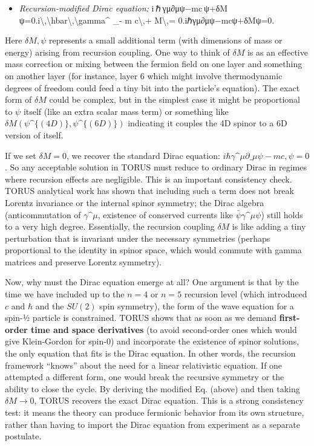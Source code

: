 \documentclass[]{article}
\begin{document}
\begin{itemize}
\item
  \emph{Recursion-modified Dirac equation:}
  i ℏ γμ∂μψ−mc ψ+δM ψ=0.i\textbackslash{},\textbackslash{}hbar\textbackslash{},\textbackslash{}gamma\^{}\mu
  \partial\_\mu \psi - m
  c\textbackslash{},\psi + \delta
  M\textbackslash{},\psi = 0.iℏγμ∂μ​ψ−mcψ+δMψ=0.
\end{itemize}

Here $\delta M,\psi$ represents a small
additional term (with dimensions of mass or energy) arising from
recursion coupling​. One way to think of $\delta M$ is
as an effective mass correction or mixing between the fermion field on
one layer and something on another layer (for instance, layer 6 which
might involve thermodynamic degrees of freedom could feed a tiny bit
into the particle's equation). The exact form of $\delta
M$ could be complex, but in the simplest case it might be proportional
to $\psi$ itself (like an extra scalar mass term) or
something like $\delta
M(\psi\^{}\{(4D)\}, \psi\^{}\{(6D)\})$
indicating it couples the 4D spinor to a 6D version of itself​.

If we set $\delta M = 0$, we recover the standard Dirac
equation: $i\hbar
\gamma\^{}\mu
\partial\_\mu \psi - m
c,\psi = 0$​. So any acceptable solution in TORUS must
reduce to ordinary Dirac in regimes where recursion effects are
negligible. This is an important consistency check. TORUS analytical
work has shown that including such a term does not break Lorentz
invariance or the internal spinor symmetry; the Dirac algebra
(anticommutation of $\gamma\^{}\mu$,
existence of conserved currents like
$\bar\psi
\gamma\^{}\mu \psi$) still
holds to a very high degree​. Essentially, the recursion coupling
$\delta M$ is like adding a tiny perturbation that is
invariant under the necessary symmetries (perhaps proportional to the
identity in spinor space, which would commute with gamma matrices and
preserve Lorentz symmetry).

Now, why must the Dirac equation emerge at all? One argument is that by
the time we have included up to the $n=4$ or $n=5$
recursion level (which introduced $c$ and
$\hbar$ and the $SU(2)$ spin symmetry), the
form of the wave equation for a spin-½ particle is constrained. TORUS
shows that as soon as we demand \textbf{first-order time and space
derivatives} (to avoid second-order ones which would give Klein-Gordon
for spin-0) and incorporate the existence of spinor solutions, the only
equation that fits is the Dirac equation​. In other words, the recursion
framework ``knows'' about the need for a linear relativistic equation.
If one attempted a different form, one would break the recursive
symmetry or the ability to close the cycle. By deriving the modified Eq.
(above) and then taking $\delta M \to 0$, TORUS
recovers the exact Dirac equation​. This is a strong consistency test:
it means the theory can produce fermionic behavior from its own
structure, rather than having to import the Dirac equation from
experiment as a separate postulate.
\end{document}
